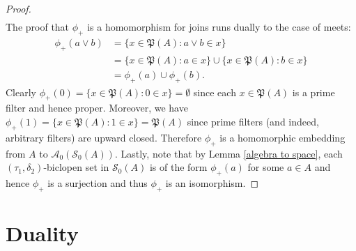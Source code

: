 \documentclass{amsart}
\theoremstyle{plain}
\theoremstyle{definition}
\begin{document}
\begin{proof}
\begin{align*}
\end{align*}
 The proof that $\phi_+$ is a homomorphism for joins runs dually to the case of meets:
\begin{align*}
    \phi_+(a\vee b)&=\{x\in\mathfrak{P}(A):a\vee b\in x\}\\&=\{x\in\mathfrak{P}(A):a\in x\}\cup\{x\in\mathfrak{P}(A):b\in x\}\\&=\phi_+(a)\cup\phi_+(b).
\end{align*}
Clearly $\phi_+(0)=\{x\in\mathfrak{P}(A):0\in x\}=\emptyset$ since each $x\in\mathfrak{P}(A)$ is a prime filter and hence proper. Moreover, we have $\phi_+(1)=\{x\in\mathfrak{P}(A):1\in x\}=\mathfrak{P}(A)$ since prime filters (and indeed, arbitrary filters) are upward closed. Therefore $\phi_+$ is a homomorphic embedding from $A$ to $\mathcal{A}_0(\mathcal{S}_0(A))$. Lastly, note that by Lemma \ref{algebra to space}, each $(\tau_1,\delta_2)$-biclopen set in $\mathcal{S}_0(A)$ is of the form $\phi_+(a)$ for some $a\in A$ and hence $\phi_+$ is a surjection and thus $\phi_+$ is an isomorphism.      
\end{proof}
























































    




\section{Duality} \label{sec:duality}
 
\end{document}
